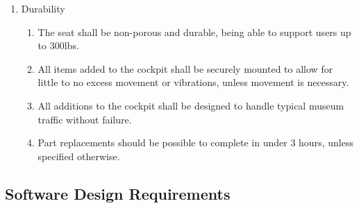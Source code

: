 \documentclass[12pt]{article} %
\begin{document}
\begin{enumerate}[label=\arabic*, leftmargin=*]
	\item Durability
	\begin{enumerate}[label=\arabic{enumi}.\arabic*, leftmargin=*]
		\item The seat shall be non-porous and durable, being able to support users up to 300lbs.
		\item All items added to the cockpit shall be securely mounted to allow for little to no excess movement or vibrations, unless movement is necessary.
		\item All additions to the cockpit shall be designed to handle typical museum traffic without failure.
		\item Part replacements should be possible to complete in under 3 hours, unless specified otherwise.
	\end{enumerate}
\end{enumerate}

\subsection{Software Design Requirements}
\end{document}
